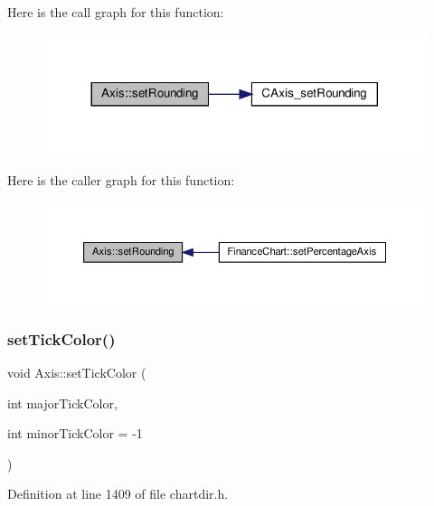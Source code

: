 Here is the call graph for this function\+:
\nopagebreak
\begin{figure}[H]
\begin{center}
\leavevmode
\includegraphics[width=317pt]{class_axis_a7e296867580eabe94b1b80abb5318762_cgraph}
\end{center}
\end{figure}
Here is the caller graph for this function\+:
\nopagebreak
\begin{figure}[H]
\begin{center}
\leavevmode
\includegraphics[width=350pt]{class_axis_a7e296867580eabe94b1b80abb5318762_icgraph}
\end{center}
\end{figure}
\mbox{\label{class_axis_acc8fbe608da1e15e4a434ef4d1814d18}} 
\subsubsection{\texorpdfstring{set\+Tick\+Color()}{setTickColor()}}
{\footnotesize\ttfamily void Axis\+::set\+Tick\+Color (\begin{DoxyParamCaption}\item[{int}]{major\+Tick\+Color,  }\item[{int}]{minor\+Tick\+Color = {\ttfamily -\/1} }\end{DoxyParamCaption})\hspace{0.3cm}{\ttfamily [inline]}}



Definition at line 1409 of file chartdir.\+h.

